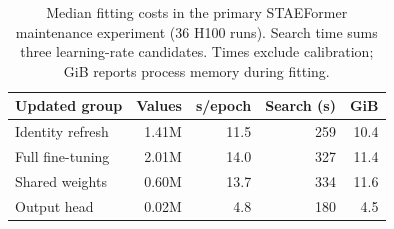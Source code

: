 \begin{table}[htbp]
\centering
\caption{Median fitting costs in the primary STAEFormer maintenance experiment (36 H100 runs). Search time sums three learning-rate candidates. Times exclude calibration; GiB reports process memory during fitting.}
\label{tab:cost}
\begin{tabular}{lrrrr}
\toprule
Updated group & Values & s/epoch & Search (s) & GiB \\
\midrule
Identity refresh & 1.41M & 11.5 & 259 & 10.4 \\
Full fine-tuning & 2.01M & 14.0 & 327 & 11.4 \\
Shared weights & 0.60M & 13.7 & 334 & 11.6 \\
Output head & 0.02M & 4.8 & 180 & 4.5 \\
\bottomrule
\end{tabular}
\end{table}
